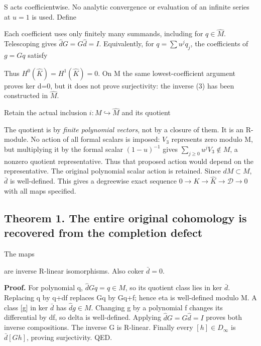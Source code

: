 S acts coefficientwise. No analytic convergence or evaluation of an
infinite series at \(u=1\) is used. Define


Each coefficient uses only finitely many summands, including for
\(q\in\widehat M\). Telescoping gives \(\widehat dG=G\widehat d=I\).
Equivalently, for \(q=\sum u^j q_j\), the coefficients of \(g=Gq\)
satisfy


Thus \(H^0(\widehat K)=H^1(\widehat K)=0\). On M the same
lowest-coefficient argument proves ker d=0, but it does not prove
surjectivity: the inverse (3) has been constructed in \(\widehat M\).

Retain the actual inclusion \(i:M\hookrightarrow\widehat M\) and its
quotient


The quotient is by \emph{finite polynomial vectors}, not by a closure of
them. It is an R-module. No action of all formal scalars is imposed:
\(V_3\) represents zero modulo M, but multiplying it by the formal
scalar \((1-u)^{-1}\) gives \(\sum_{j\ge0}u^jV_3\notin M\), a nonzero
quotient representative. Thus that proposed action would depend on the
representative. The original polynomial scalar action is retained. Since
\(dM\subset M\), \(\bar d\) is well-defined. This gives a degreewise
exact sequence \(0\to K\to\widehat K\to\mathcal D\to0\) with all maps
specified.

\subsection{Theorem 1. The entire original cohomology is recovered from
the completion defect}

The maps


are inverse R-linear isomorphisms. Also coker \(\bar d=0\).

\textbf{Proof.} For polynomial q, \(\widehat dGq=q\in M\), so its
quotient class lies in ker \(\bar d\). Replacing q by q+df replaces Gq
by Gq+f; hence eta is well-defined modulo M. A class {[}g{]} in ker
\(\bar d\) has \(\widehat dg\in M\). Changing g by a polynomial f
changes its differential by df, so delta is well-defined. Applying
\(\widehat dG=G\widehat d=I\) proves both inverse compositions. The
inverse G is R-linear. Finally every \([h]\in D_\infty\) is
\(\bar d[G h]\), proving surjectivity. QED.

